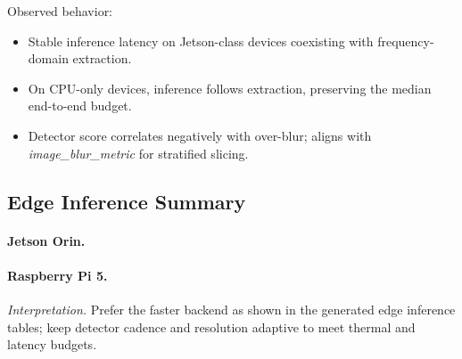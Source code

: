 Observed behavior:
\begin{itemize}
    \item Stable inference latency on Jetson-class devices coexisting with frequency-domain extraction.
    \item On CPU-only devices, inference follows extraction, preserving the median end-to-end budget.
    \item Detector score correlates negatively with over-blur; aligns with \emph{image\_blur\_metric} for stratified slicing.
\end{itemize}


\subsection{Edge Inference Summary}
\label{sec:validation:edge-summary}

\paragraph{Jetson Orin.}

\paragraph{Raspberry Pi 5.}

\noindent\textit{Interpretation.} Prefer the faster backend as shown in the generated edge inference tables; keep detector cadence and resolution adaptive to meet thermal and latency budgets.


